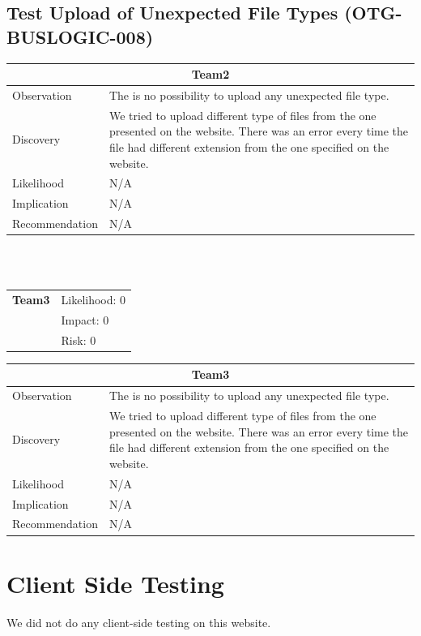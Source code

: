 \documentclass[headsepline,footsepline,footinclude=false,oneside,fontsize=11pt,paper=a4,listof=totoc,bibliography=totoc]{scrbook} %
\begin{document}
\pagebreak
\subsection{Test Upload of Unexpected File Types (OTG-BUSLOGIC-008) }
\begin{tabular}{ l|p{11cm}  }
	\hline
	\multicolumn{2}{c}{\textbf{Team2}} \\
	\hline
	Observation   & The is no possibility to upload any unexpected file type.  \\
	Discovery  & We tried to upload different type of files from the one presented on the website. There was an error every time the file had different extension from the one specified on the website.  \\
	Likelihood &  N/A \\
	Implication    & N/A \\
	Recommendation & N/A \\
	\hline
\end{tabular}
\\
\vspace{0.5cm}
\\
\begin{tabular}{cR{12cm}}
	\textbf{Team3} & Likelihood: 0\\& Impact: 0\\& Risk: 0
\end{tabular}

\begin{tabular}{ l|p{11cm}  }
	\hline
	\multicolumn{2}{c}{\textbf{Team3}} \\
	\hline
	Observation   & The is no possibility to upload any unexpected file type.  \\
	Discovery  & We tried to upload different type of files from the one presented on the website. There was an error every time the file had different extension from the one specified on the website.  \\
	Likelihood &  N/A \\
	Implication    & N/A \\
	Recommendation & N/A \\
	\hline
\end{tabular}
\pagebreak
 
\section{Client Side Testing}

We did not do any client-side testing on this website.

\appendix{}

\glsaddall{} %
\printglossaries{}

\printbibliography{}
\end{document}
